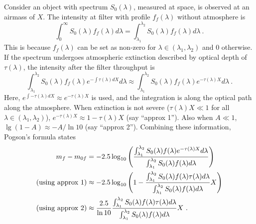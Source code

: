 Consider an object with spectrum $ S_0(\lambda) $, measured at space, is observed at an airmass of $ X $. The intensity at filter with profile $ f_f(\lambda) $ without atmosphere is 
\begin{equation}
  \int_{0}^{\infty} S_0(\lambda) f_f(\lambda) d\lambda 
  = \int_{\lambda_1}^{\lambda_2} S_0(\lambda) f_f(\lambda) d\lambda ~.
\end{equation}
This is because $ f_f(\lambda) $ can be set as non-zero for $ \lambda \in (\lambda_1, \lambda_2) $ and 0 otherwise. If the spectrum undergoes atmospheric extinction described by optical depth of $ \tau(\lambda) $, the intensity after the filter throughput is
\begin{equation}
  \int_{\lambda_1}^{\lambda_2} 
    S_0(\lambda) f_f(\lambda) e^{-\int \tau(\lambda) dX} d\lambda 
  \approx 
    \int_{\lambda_1}^{\lambda_2} 
    S_0(\lambda) f_f(\lambda)  e^{-\tau(\lambda) X} d\lambda ~.
\end{equation}
Here, $ e^{\int -\tau(\lambda) dX} \approx e^{-\tau(\lambda) X} $ is used, and the integration is along the optical path along the atmosphere. When extinction is not severe ($ \tau(\lambda) X \ll 1 $ for all $ \lambda \in (\lambda_1, \lambda_2)$), $ e^{-\tau(\lambda) X} \approx 1 - \tau(\lambda) X $ (say ``approx 1''). Also when $ A \ll 1 $, $ \lg (1 - A) \approx - A / \ln 10 $ (say ``approx 2''). Combining these information, Pogson's formula states
\begin{equation}
\begin{aligned}
  m_f - m_{0f}
    &= -2.5 \log_{10}
      \qty( \frac{\int_{\lambda_1}^{\lambda_2} S_0(\lambda) f(\lambda) e^{-\tau(\lambda) X} d\lambda}
      {\int_{\lambda_1}^{\lambda_2} S_0(\lambda) f(\lambda) d\lambda} ) \\
    \mathrm{(using\ approx\ 1)}
    &\approx -2.5 \log_{10} 
      \qty( 1 - \frac{\int_{\lambda_1}^{\lambda_2} S_0(\lambda) f(\lambda) \tau(\lambda) d\lambda}
        {\int_{\lambda_1}^{\lambda_2} S_0(\lambda) f(\lambda) d\lambda} X ) \\
    \mathrm{(using\ approx\ 2)}
    &\approx \frac{2.5}{\ln 10} 
      \frac{\int_{\lambda_1}^{\lambda_2} S_0(\lambda) f(\lambda) \tau(\lambda) d\lambda}
        {\int_{\lambda_1}^{\lambda_2} S_0(\lambda) f(\lambda) d\lambda} X ~.
\end{aligned}
\end{equation}

